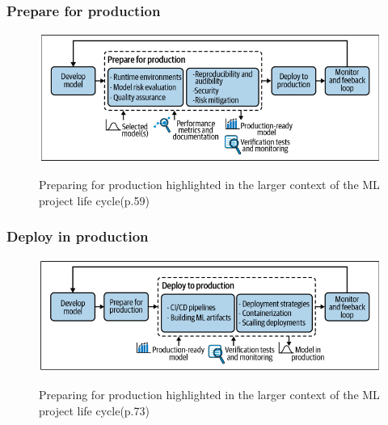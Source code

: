 \subsubsection{Prepare for production}

\begin{figure}[!htbp]
    \caption{Preparing for production highlighted in the larger context of the ML project
    life cycle\cite{treveil2020introducing}(p.59)}
    \centering
    \includegraphics[scale=0.5]{images/prep-prod-intro}
    \label{fig:prep-prod-intro}
\end{figure}


\subsubsection{Deploy in production}

\begin{figure}[!htbp]
    \caption{Preparing for production highlighted in the larger context of the ML project
    life cycle\cite{treveil2020introducing}(p.73)}
    \centering
    \includegraphics[scale=0.5]{images/deploy-prod}
    \label{fig:deploy-prod}
\end{figure}


